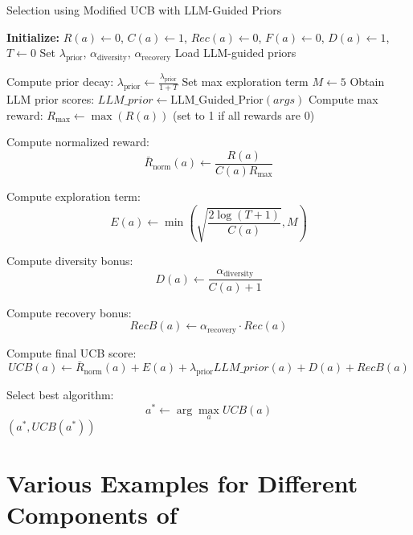 \begin{algorithm*}
\caption{Selection using Modified UCB with LLM-Guided Priors}
\begin{algorithmic}[1]
\State \textbf{Initialize:} $R(a) \gets 0$, $C(a) \gets 1$, $Rec(a) \gets 0$, $F(a) \gets 0$, $D(a) \gets 1$, $T \gets 0$
\State Set $\lambda_{\text{prior}}$, $\alpha_{\text{diversity}}$, $\alpha_{\text{recovery}}$
\State Load LLM-guided priors

    \State Compute prior decay: $\lambda_{\text{prior}} \gets \frac{\lambda_{\text{prior}}}{1 + T}$ 
    \State Set max exploration term $M \gets 5$
    \State Obtain LLM prior scores: $LLM\_prior \gets \text{LLM\_Guided\_Prior}(args)$
    \State Compute max reward: $R_{\max} \gets \max(R(a))$ (set to 1 if all rewards are 0)

        \State Compute normalized reward:
        \[
        \bar{R}_{\text{norm}}(a) \gets \frac{R(a)}{C(a) R_{\max}}
        \]

        \State Compute exploration term:
        \[
        E(a) \gets \min\left(\sqrt{\frac{2 \log(T+1)}{C(a)}}, M\right)
        \]

        \State Compute diversity bonus:
        \[
        D(a) \gets \frac{\alpha_{\text{diversity}}}{C(a) + 1}
        \]

        \State Compute recovery bonus:
        \[
        RecB(a) \gets \alpha_{\text{recovery}} \cdot Rec(a)
        \]

        \State Compute final UCB score:
        \[
        UCB(a) \gets \bar{R}_{\text{norm}}(a) + E(a) + \lambda_{\text{prior}} LLM\_prior(a) + D(a) + RecB(a)
        \]
    \EndFor
    
    \State Select best algorithm:
    \[
    a^* \gets \arg\max_{a} UCB(a)
    \]
    \State \Return $(a^*, UCB(a^*))$
\EndProcedure

\end{algorithmic}
\label{algo:selection}
\end{algorithm*}


\section{Various Examples for Different Components of \plangen{}}
\label{app:examples}

